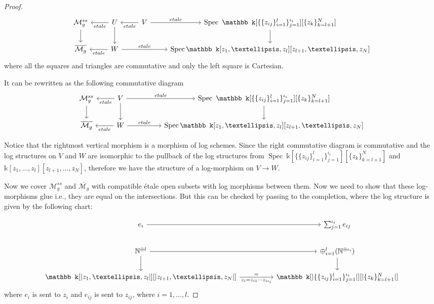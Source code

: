 \documentclass[11pt]{amsart}
\DeclareMathOperator{\Spec}{Spec}
\theoremstyle{plain}
\numberwithin{equation}{section}
\theoremstyle{definition}
\theoremstyle{plain}
\begin{document}
\begin{proof}
\begin{equation}
\begin{tikzcd}
\mathcal M^{ss}_g\arrow{d} & U \arrow{l}{etale}\arrow{d} & V \arrow{r}{etale}\arrow{l}{etale} & \Spec ~\mathbb k[\{\{z_{ij}\}^{l}_{i=1}\}^{\iota_i}_{j=1}][\{z_{k}\}^N_{k=l+1}] \arrow{d}\\
\overline{\mathcal M_g} & W\arrow{l}{etale} \arrow{rr}{etale} &&  \Spec \mathbb k[z_1, \dots, z_l][z_{l+1}, \dots, z_N] 
\end{tikzcd}
\end{equation}
where all the squares and triangles are commutative and only the left square is Cartesian. 

It can be rewritten as the following commutative diagram
\begin{equation}
\begin{tikzcd}
\mathcal M^{ss}_g\arrow{d} & V \arrow{l}{etale}\arrow{d} \arrow{rr}{etale} &  & \Spec ~\mathbb k[\{\{z_{ij}\}^{l}_{i=1}\}^{\iota_i}_{j=1}][\{z_{k}\}^N_{k=l+1}] \arrow{d}\\
\overline{\mathcal M_g} & W\arrow{l}{etale} \arrow{rr}{etale} && \Spec  \mathbb k[z_1, \dots, z_l][z_{l+1}, \dots, z_N] 
\end{tikzcd}
\end{equation}

Notice that the rightmost vertical morphism is a morphism of log schemes. Since the right commutative diagram is commutative and the log structures on $V$ and $W$ are isomorphic to the pullback of the log structures from $\Spec ~\mathbb k[\{\{z_{ij}\}^{l}_{i=1}\}^{\iota_i}_{j=1}][\{z_{k}\}^N_{k=l+1}]$ and $\mathbb k[z_1, \dots, z_l][z_{l+1}, \dots, z_N]$, therefore we have the structure of a log-morphism on $V\rightarrow W$.  

Now we cover $\mathcal M^{ss}_g$ and $\overline{\mathcal M_g}$ with compatible \'etale open subsets with log morphisms between them. Now we need to show that these log-morphisms glue i.e., they are equal on the intersections. But this can be checked by passing to the completion, where the log structure is given by the following chart:

\begin{equation}
\begin{tikzcd}
& e_i\arrow{rr} && \sum^{\iota_i}_{j=1} e_{ij}\\
& \mathbb N^{\oplus l}\arrow{d}\arrow{rr} && \oplus^l_{i=1}(\mathbb N^{\oplus \iota_i})\arrow{d} & 
\\
& \mathbb k[|z_1, \dots, z_l|][|z_{l+1}, \dots, z_N|] \arrow["="]{rr}[swap]{z_i=z_{i1}\cdots z_{i\iota_i} } && \mathbb k[|\{\{z_{ij}\}^{l}_{i=1}\}^{\iota_i}_{j=1}|][|\{z_{k}\}^N_{k=l+1}|] & 
\end{tikzcd}
\end{equation}
where $e_i$ is sent to $z_i$ and $e_{ij}$ is sent to $z_{ij}$, where $i=1,\dots , l$.


\end{proof}
\end{document}
